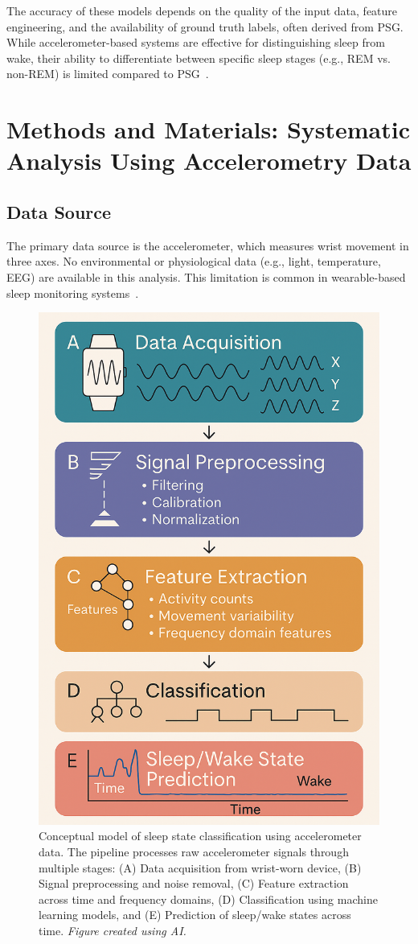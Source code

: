 \documentclass[conference]{IEEEtran}
\begin{document}
The accuracy of these models depends on the quality of the input data, feature engineering, and the availability of ground truth labels, often derived from PSG. While accelerometer-based systems are effective for distinguishing sleep from wake, their ability to differentiate between specific sleep stages (e.g., REM vs. non-REM) is limited compared to PSG~\cite{pmc4883440, researchgate2021, kushida2001, griessenberger2013}.

\section{Methods and Materials: Systematic Analysis Using Accelerometry Data}

\subsection{Data Source}
The primary data source is the accelerometer, which measures wrist movement in three axes. No environmental or physiological data (e.g., light, temperature, EEG) are available in this analysis. This limitation is common in wearable-based sleep monitoring systems~\cite{researchgate2021}.

\begin{figure}[h]
	\centering
	\includegraphics[width=0.3\linewidth]{figures/conceptual_model.png}
	\caption{Conceptual model of sleep state classification using accelerometer data. The pipeline processes raw accelerometer signals through multiple stages: (A) Data acquisition from wrist-worn device, (B) Signal preprocessing and noise removal, (C) Feature extraction across time and frequency domains, (D) Classification using machine learning models, and (E) Prediction of sleep/wake states across time. \textit{Figure created using AI.}}
	\label{fig:conceptual_model}
\end{figure}
\end{document}
